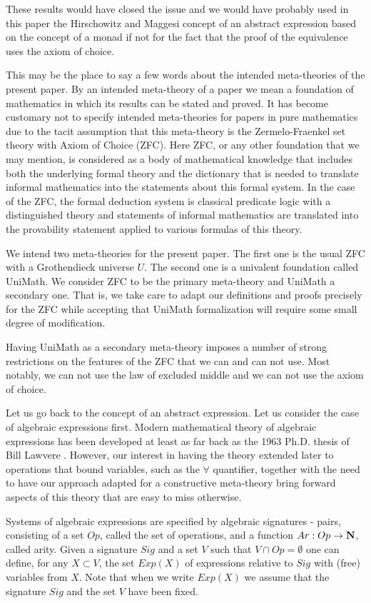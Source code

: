 \documentclass[12pt]{amsart}
\newcommand{\sr}{\rightarrow}
\newcommand{\nn}{{\bf N\rm}}
\newcommand{\nat}{\nn}
\begin{document}
These results would have closed the issue and we would have probably used in this paper the Hirschowitz and Maggesi concept of an abstract expression based on the concept of a monad if not for the fact that the proof of the equivalence uses the axiom of choice.  

This may be the place to say a few words about the intended meta-theories of the present paper. By an intended meta-theory of a paper we mean a foundation of mathematics in which its results can be stated and proved. It has become customary not to specify intended meta-theories for papers in pure mathematics due to the tacit assumption that this meta-theory is the Zermelo-Fraenkel set theory with Axiom of Choice (ZFC). Here ZFC, or any other foundation that we may mention, is considered as a body of mathematical knowledge that includes both the underlying formal theory and the dictionary that is needed to translate informal mathematics into the statements about this formal system. In the case of the ZFC, the formal deduction system is classical predicate logic with a distinguished theory and statements of informal mathematics are translated into the provability statement applied to various formulas of this theory. 

We intend two meta-theories for the present paper. The first one is the usual ZFC with a Grothendieck universe $U$. The second one is a  univalent foundation called UniMath. We consider ZFC to be the primary meta-theory and UniMath a secondary one. That is, we take care to adapt our definitions and proofs precisely for the ZFC while accepting that UniMath formalization will require some small degree of modification.

Having UniMath as a secondary meta-theory imposes a number of strong restrictions on the features of the ZFC that we can and can not use. Most notably, we can not use the law of excluded middle and we can not use the axiom of choice. 

Let us go back to the concept of an abstract expression. Let us consider the case of algebraic expressions first. Modern mathematical theory of algebraic expressions has been developed at least as far back as the 1963 Ph.D. thesis of Bill Lawvere \cite{Lawvere}. However, our interest in having the theory extended later to operations that bound variables, such as the $\forall$ quantifier, together with the need to have our approach adapted for a constructive meta-theory bring forward aspects of this theory that are easy to miss otherwise. 

Systems of algebraic expressions are specified by algebraic signatures - pairs, consisting of a set $Op$, called the set of operations, and a function $Ar:Op\sr \nat$, called arity. Given a signature $Sig$ and a set $V$ such that $V\cap Op=\emptyset$ one can define, for any $X\subset V$, the set $Exp(X)$ of expressions relative to $Sig$ with (free) variables from $X$. Note that when we write $Exp(X)$ we assume that the signature $Sig$ and the set $V$ have been fixed. 
\end{document}

